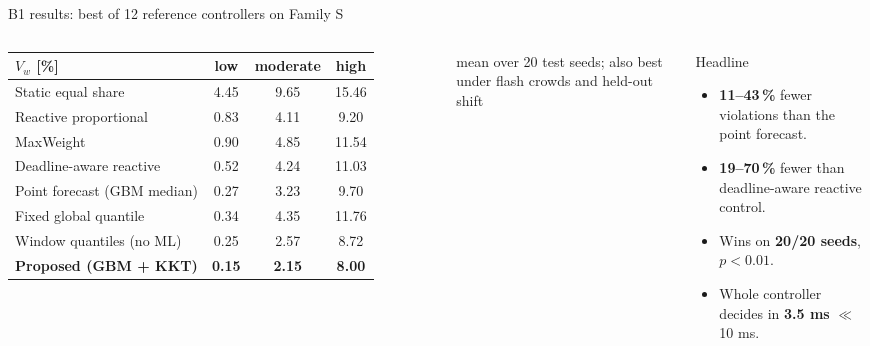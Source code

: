 \documentclass[aspectratio=169,11pt]{beamer}
\newcommand{\ours}{\rowcolor{good!15}}
\begin{document}
\begin{frame}{B1 results: best of 12 reference controllers on Family S}
\begin{columns}[c]
\footnotesize
\begin{tabular}{lccc}
\toprule
$V_w$ [\%] & low & moderate & high \\
\midrule
Static equal share & 4.45 & 9.65 & 15.46 \\
Reactive proportional & 0.83 & 4.11 & 9.20 \\
MaxWeight & 0.90 & 4.85 & 11.54 \\
Deadline-aware reactive & 0.52 & 4.24 & 11.03 \\
Point forecast (GBM median) & 0.27 & 3.23 & 9.70 \\
Fixed global quantile & 0.34 & 4.35 & 11.76 \\
Window quantiles (no ML) & 0.25 & 2.57 & 8.72 \\
\ours \textbf{Proposed (GBM + KKT)} & \textbf{0.15} & \textbf{2.15} & \textbf{8.00} \\
\bottomrule
\end{tabular}

{\scriptsize mean over 20 test seeds; also best under flash crowds and held-out shift}
\small
\begin{exampleblock}{Headline}
\begin{itemize}
  \item \textbf{11--43\,\%} fewer violations than the point forecast.
  \item \textbf{19--70\,\%} fewer than deadline-aware reactive control.
  \item Wins on \textbf{20/20 seeds}, $p < 0.01$.
  \item Whole controller decides in \textbf{3.5 ms} $\ll$ 10 ms.
\end{itemize}
\end{exampleblock}
\end{columns}
\end{frame}
\end{document}
